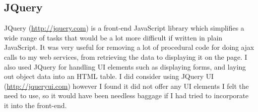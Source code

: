 \documentclass[12pt]{article}
\begin{document}
  \subsection{JQuery}
    JQuery (\url{http://jquery.com}) is a front-end JavaScript library which simplifies a wide range of tasks that would be a lot more difficult if written in plain JavaScript. It was very useful for removing a lot of procedural code for doing ajax calls to my web services, from retrieving the data to displaying it on the page. I also used JQuery for handling UI elements such as displaying forms, and laying out object data into an HTML table. I did consider using JQuery UI (\url{http://jqueryui.com}) however I found it did not offer any UI elements I felt the need to use, so it would have been needless baggage if I had tried to incorporate it into the front-end.



\end{document}
